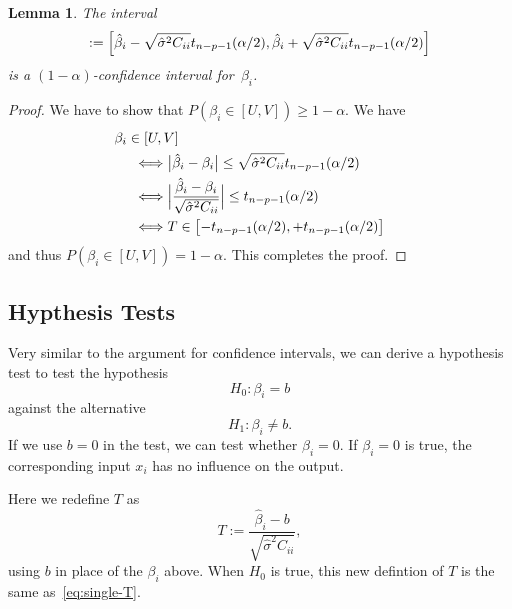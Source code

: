 \documentclass[
  a4paper,
]{article}
\newtheorem{lemma}{Lemma}[section]
\theoremstyle{definition}
\theoremstyle{definition}
\theoremstyle{definition}
\theoremstyle{definition}
\theoremstyle{remark}
\begin{document}
\begin{lemma}
\protect\hypertarget{lem:single-CI}{}\label{lem:single-CI}The interval
\begin{equation*}
  [U, V]
  := \Bigl[ \hat\beta_i - \sqrt{\hat\sigma^2 C_{ii}}t_{n-p-1}(\alpha/2), \hat\beta_i + \sqrt{\hat\sigma^2 C_{ii}}t_{n-p-1}(\alpha/2) \Bigr]
\end{equation*}
is a \((1-\alpha)\)-confidence interval for~\(\beta_i\).
\end{lemma}

\begin{proof}
We have to show that \(P(\beta_i \in [U, V]) \geq 1-\alpha\). We have
\begin{align*}
  &\hskip-5mm \beta_i \in [U, V] \\
  &\Longleftrightarrow
    \bigl| \hat\beta_i - \beta_i \bigr|
        \leq \sqrt{\hat\sigma^2 C_{ii}}t_{n-p-1}(\alpha/2) \\
  &\Longleftrightarrow
    \Bigl| \frac{\hat\beta_i - \beta_i}{\sqrt{\hat\sigma^2 C_{ii}}} \Bigr|
        \leq t_{n-p-1}(\alpha/2) \\
  &\Longleftrightarrow
    T \in \bigl[-t_{n-p-1}(\alpha/2), +t_{n-p-1}(\alpha/2)\bigr]
\end{align*}
and thus \(P(\beta_i \in [U, V]) = 1 - \alpha\). This completes the proof.
\end{proof}

\hypertarget{hypthesis-tests}{%
\subsection{Hypthesis Tests}\label{hypthesis-tests}}

Very similar to the argument for confidence intervals, we can
derive a hypothesis test to test the hypothesis
\begin{equation*}
  H_0\colon \beta_i = b
\end{equation*}
against the alternative
\begin{equation*}
  H_1\colon \beta_i \neq b.
\end{equation*}
If we use \(b = 0\) in the test, we can test whether \(\beta_i = 0\).
If \(\beta_i = 0\) is true, the corresponding input \(x_i\) has no influence
on the output.

Here we redefine \(T\) as
\begin{equation}
  T
  := \frac{\hat\beta_i - b}{\sqrt{\hat\sigma^2 C_{ii}}},  \label{eq:single-test}
\end{equation}
using \(b\) in place of the \(\beta_i\) above. When \(H_0\) is true, this new
defintion of \(T\) is the same as~\eqref{eq:single-T}.
\end{document}
